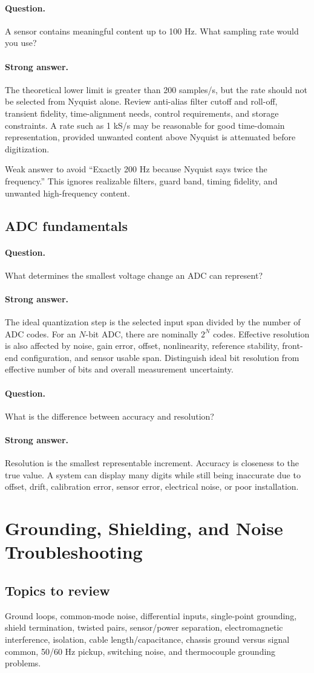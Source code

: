 \documentclass[11pt]{article}
\newcommand{\q}[1]{\paragraph{Question.} #1}
\newcommand{\ans}[1]{\paragraph{Strong answer.} #1}
\begin{document}
\q{A sensor contains meaningful content up to 100 Hz. What sampling rate would you use?}
\ans{The theoretical lower limit is greater than 200 samples/s, but the rate should
not be selected from Nyquist alone. Review anti-alias filter cutoff and roll-off,
transient fidelity, time-alignment needs, control requirements, and storage
constraints. A rate such as 1 kS/s may be reasonable for good time-domain
representation, provided unwanted content above Nyquist is attenuated before
digitization.}

\begin{warningbox}{Weak answer to avoid}
``Exactly 200 Hz because Nyquist says twice the frequency.'' This ignores
realizable filters, guard band, timing fidelity, and unwanted high-frequency
content.
\end{warningbox}

\subsection{ADC fundamentals}
\q{What determines the smallest voltage change an ADC can represent?}
\ans{The ideal quantization step is the selected input span divided by the number
of ADC codes. For an \(N\)-bit ADC, there are nominally \(2^N\) codes. Effective
resolution is also affected by noise, gain error, offset, nonlinearity, reference
stability, front-end configuration, and sensor usable span. Distinguish ideal bit
resolution from effective number of bits and overall measurement uncertainty.}

\q{What is the difference between accuracy and resolution?}
\ans{Resolution is the smallest representable increment. Accuracy is closeness to
the true value. A system can display many digits while still being inaccurate due
to offset, drift, calibration error, sensor error, electrical noise, or poor
installation.}

\section{Grounding, Shielding, and Noise Troubleshooting}

\subsection{Topics to review}
Ground loops, common-mode noise, differential inputs, single-point grounding,
shield termination, twisted pairs, sensor/power separation, electromagnetic
interference, isolation, cable length/capacitance, chassis ground versus signal
common, 50/60 Hz pickup, switching noise, and thermocouple grounding problems.
\end{document}
